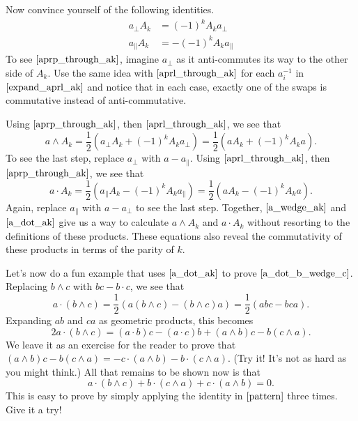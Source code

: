\documentclass{article}
\newcommand{\prl}{\parallel}
\newcommand{\prp}{\perp}
\begin{document}
Now convince yourself of the following identities.
\begin{align}
a_{\prp}A_k &= (-1)^k A_ka_{\prp}\label{aprp_through_ak} \\
a_{\prl}A_k &= -(-1)^k A_ka_{\prl}\label{aprl_through_ak}
\end{align}
To see $\eqref{aprp_through_ak}$, imagine $a_{\prp}$ as it
anti-commutes its way to the other side of $A_k$.  Use the
same idea with $\eqref{aprl_through_ak}$ for each $a_i^{-1}$
in $\eqref{expand_aprl_ak}$ and notice that in each case, exactly one of the swaps
is commutative instead of anti-commutative.

Using $\eqref{aprp_through_ak}$, then $\eqref{aprl_through_ak}$, we see that
\begin{equation}\label{a_wedge_ak}
a\wedge A_k = \frac{1}{2}(a_{\prp}A_k+(-1)^kA_ka_{\prp})=\frac{1}{2}(aA_k+(-1)^kA_ka).
\end{equation}
To see the last step, replace $a_{\prp}$ with $a-a_{\prl}$.  Using
$\eqref{aprl_through_ak}$, then $\eqref{aprp_through_ak}$, we see that
\begin{equation}\label{a_dot_ak}
a\cdot A_k = \frac{1}{2}(a_{\prl}A_k-(-1)^kA_ka_{\prl})=\frac{1}{2}(aA_k-(-1)^kA_ka).
\end{equation}
Again, replace $a_{\prl}$ with $a-a_{\prp}$ to see the last step.  Together,
$\eqref{a_wedge_ak}$ and $\eqref{a_dot_ak}$ give us a way to calculate
$a\wedge A_k$ and $a\cdot A_k$ without resorting to the definitions
of these products.  These equations also reveal the commutativity of these products
in terms of the parity of $k$.

Let's now do a fun example that uses $\eqref{a_dot_ak}$ to prove $\eqref{a_dot_b_wedge_c}$.
Replacing $b\wedge c$ with $bc-b\cdot c$, we see that
\begin{equation}\label{pattern}
a\cdot(b\wedge c) = \frac{1}{2}(a(b\wedge c)-(b\wedge c)a) = \frac{1}{2}(abc-bca).
\end{equation}
Expanding $ab$ and $ca$ as geometric products, this becomes
\begin{equation*}
2a\cdot (b\wedge c) = (a\cdot b)c - (a\cdot c)b + (a\wedge b)c - b(c\wedge a).
\end{equation*}
We leave it as an exercise for the reader to prove that
$(a\wedge b)c-b(c\wedge a)=-c\cdot(a\wedge b)-b\cdot(c\wedge a)$.
(Try it!  It's not as hard as you might think.)  All that remains to
be shown now is that
\begin{equation*}
a\cdot(b\wedge c) + b\cdot(c\wedge a) + c\cdot(a\wedge b) = 0.
\end{equation*}
This is easy to prove by simply applying the identity in $\eqref{pattern}$
three times.  Give it a try!
\end{document}
